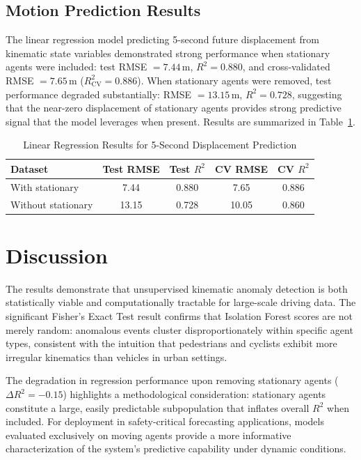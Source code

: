 \documentclass[conference]{IEEEtran}
\begin{document}
\subsection{Motion Prediction Results}

The linear regression model predicting 5-second future displacement from kinematic state variables demonstrated strong performance when stationary agents were included: test RMSE $= 7.44$\,m, $R^2 = 0.880$, and cross-validated RMSE $= 7.65$\,m ($R^2_\text{CV} = 0.886$). When stationary agents were removed, test performance degraded substantially: RMSE $= 13.15$\,m, $R^2 = 0.728$, suggesting that the near-zero displacement of stationary agents provides strong predictive signal that the model leverages when present. Results are summarized in Table~\ref{tab:regression}.

\begin{table}[h]
\centering
\caption{Linear Regression Results for 5-Second Displacement Prediction}
\label{tab:regression}
\begin{tabular}{lcccc}
\toprule
Dataset & Test RMSE & Test $R^2$ & CV RMSE & CV $R^2$ \\
\midrule
With stationary    & 7.44  & 0.880 & 7.65  & 0.886 \\
Without stationary & 13.15 & 0.728 & 10.05 & 0.860 \\
\bottomrule
\end{tabular}
\end{table}

\section{Discussion}

The results demonstrate that unsupervised kinematic anomaly detection is both statistically viable and computationally tractable for large-scale driving data. The significant Fisher's Exact Test result confirms that Isolation Forest scores are not merely random: anomalous events cluster disproportionately within specific agent types, consistent with the intuition that pedestrians and cyclists exhibit more irregular kinematics than vehicles in urban settings.

The degradation in regression performance upon removing stationary agents ($\Delta R^2 = -0.15$) highlights a methodological consideration: stationary agents constitute a large, easily predictable subpopulation that inflates overall $R^2$ when included. For deployment in safety-critical forecasting applications, models evaluated exclusively on moving agents provide a more informative characterization of the system's predictive capability under dynamic conditions.
\end{document}
